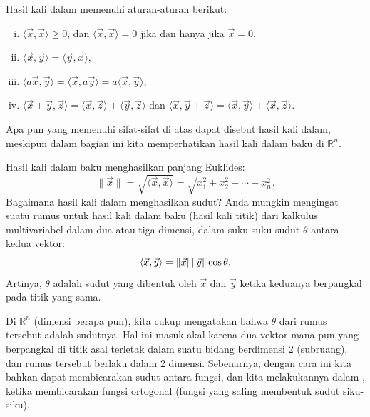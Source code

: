 Hasil kali dalam memenuhi aturan-aturan berikut:
\begin{enumerate}[(i)]
\item $\langle \vec{x} , \vec{x} \rangle \geq 0$, dan
$\langle \vec{x} , \vec{x} \rangle = 0$ jika dan hanya jika $\vec{x} = 0$,
\item $\langle \vec{x} , \vec{y} \rangle = \langle \vec{y} , \vec{x}
\rangle$,
\item $\langle a\vec{x} , \vec{y} \rangle =
\langle \vec{x} , a\vec{y} \rangle =
a \langle \vec{x} , \vec{y} \rangle$,
\item $\langle \vec{x} +  \vec{y} , \vec{z} \rangle =
\langle \vec{x} , \vec{z} \rangle +
\langle \vec{y} , \vec{z} \rangle$ dan
$\langle \vec{x}, \vec{y} + \vec{z} \rangle =
\langle \vec{x} , \vec{y} \rangle +
\langle \vec{x} , \vec{z} \rangle$.
\end{enumerate}
Apa pun yang memenuhi sifat-sifat di atas dapat disebut hasil kali
dalam, meskipun dalam bagian ini kita memperhatikan
hasil kali dalam baku di ${\mathbb{R}}^n$.

\medskip

Hasil kali dalam baku menghasilkan panjang Euklides:
\begin{equation*}
\lVert{\vec{x}}\rVert = \sqrt{\langle \vec{x}, \vec{x} \rangle}
= \sqrt{x_1^2 + x_2^2 + \cdots + x_n^2} .
\end{equation*}
Bagaimana hasil kali dalam menghasilkan sudut?
Anda mungkin mengingat suatu rumus
untuk hasil kali dalam baku (hasil kali titik)
dari kalkulus multivariabel dalam
dua atau tiga dimensi,
dalam suku-suku
sudut $\theta$ antara kedua vektor:
\begin{equation*}
\langle \vec{x}, \vec{y} \rangle
=
\lVert{\vec{x}}\rVert \lVert{\vec{y}}\rVert \cos \theta.
\avoidbreak
\end{equation*}
Artinya, $\theta$ adalah sudut yang dibentuk oleh $\vec{x}$ dan $\vec{y}$
ketika keduanya berpangkal pada titik yang sama.

Di ${\mathbb{R}}^n$ (dimensi berapa pun), kita cukup mengatakan bahwa $\theta$
dari rumus tersebut adalah sudutnya.
Hal ini masuk akal karena dua vektor mana pun yang berpangkal di titik asal
terletak dalam suatu bidang berdimensi 2 (subruang),
dan rumus tersebut berlaku dalam 2 dimensi.
Sebenarnya, dengan cara ini kita bahkan dapat membicarakan sudut antara fungsi, dan
kita melakukannya dalam , ketika membicarakan fungsi ortogonal
(fungsi yang saling membentuk sudut siku-siku).

